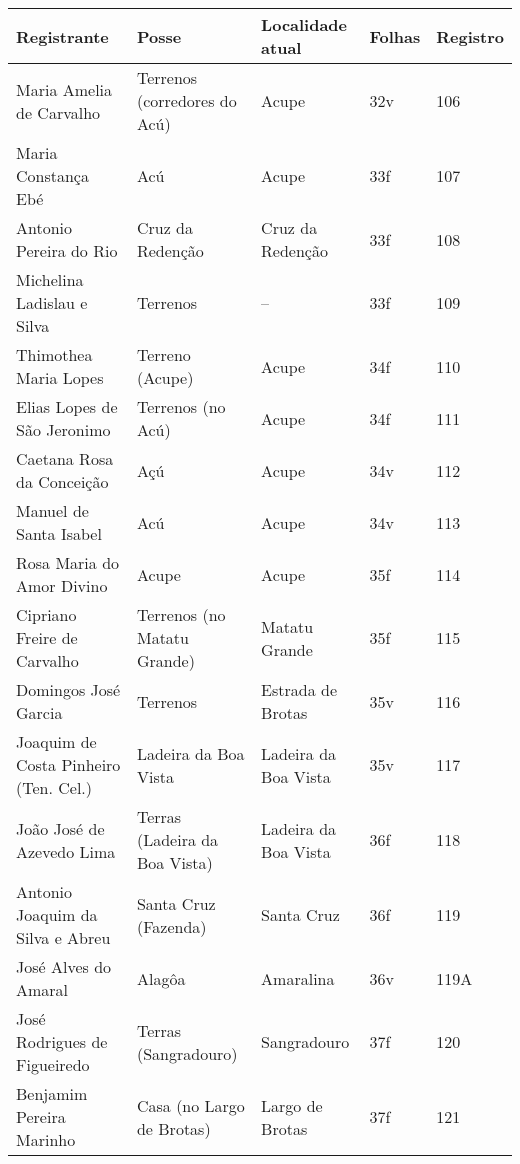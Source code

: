 \begin{table}[ht]
{
\begin{minipage}{\textwidth}
\begin{tiny}
\begin{tabular}{p{4cm}p{4cm}p{4cm}ll}
\toprule
Registrante									&Posse					&Localidade atual			&Folhas			&Registro		\\
\midrule
\midrule
Maria Amelia de Carvalho							&Terrenos (corredores do Acú)		&Acupe					&32v			&106			\\
Maria Constança Ebé								&Acú					&Acupe					&33f			&107			\\
Antonio Pereira do Rio								&Cruz da Redenção			&Cruz da Redenção			&33f			&108			\\
Michelina Ladislau e Silva							&Terrenos				&--					&33f			&109			\\
Thimothea Maria Lopes								&Terreno (Acupe)			&Acupe					&34f			&110			\\
Elias Lopes de São Jeronimo							&Terrenos (no Acú)			&Acupe					&34f			&111			\\
Caetana Rosa da Conceição							&Açú					&Acupe					&34v			&112			\\
Manuel de Santa Isabel								&Acú					&Acupe					&34v			&113			\\
Rosa Maria do Amor Divino							&Acupe					&Acupe					&35f			&114			\\
Cipriano Freire de Carvalho							&Terrenos (no Matatu Grande)		&Matatu Grande				&35f			&115			\\
Domingos José Garcia								&Terrenos				&Estrada de Brotas			&35v			&116			\\
Joaquim de Costa Pinheiro (Ten. Cel.)						&Ladeira da Boa Vista			&Ladeira da Boa Vista			&35v			&117			\\
João José de Azevedo Lima							&Terras (Ladeira da Boa Vista)		&Ladeira da Boa Vista			&36f			&118			\\
Antonio Joaquim da Silva e Abreu						&Santa Cruz (Fazenda)			&Santa Cruz				&36f			&119			\\
José Alves do Amaral								&Alagôa					&Amaralina				&36v			&119A			\\
José Rodrigues de Figueiredo							&Terras (Sangradouro)			&Sangradouro				&37f			&120			\\
Benjamim Pereira Marinho							&Casa (no Largo de Brotas)		&Largo de Brotas			&37f			&121			\\

\end{tabular}
\end{tiny}
\end{minipage}}
\end{table}
